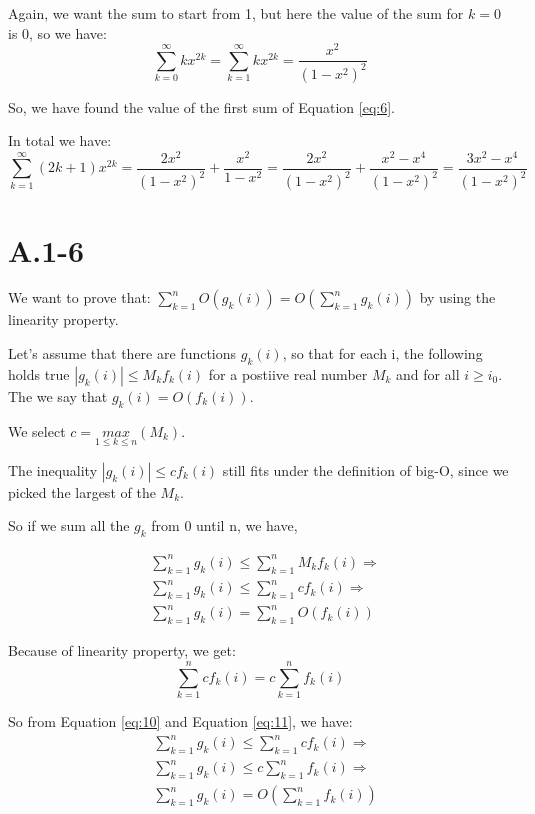 \documentclass{article}
\begin{document}
Again, we want the sum to start from 1, but here the value of the sum for $k = 0$ is 0, so we have:
\begin{equation*}
    \sum_{k=0}^{\infty}{kx^{2k}} = \sum_{k=1}^{\infty}{kx^{2k}} = \frac{x^{2}}{(1-x^{2})^{2}} 
\end{equation*}


So, we have found the value of the first sum of Equation \ref{eq:6}.

In total we have:
\begin{equation*}
    \sum_{k=1}^{\infty}{(2k+1)x^{2k}} = \frac{2x^{2}}{(1-x^{2})^{2}} + \frac{x^{2}}{1-x^{2}} =  \frac{2x^{2}}{(1-x^{2})^{2}}  + \frac{x^{2} - x^{4}}{(1 - x^{2})^{2}} = \frac{3x^{2} - x^{4}}{(1-x^{2})^{2}} 
\end{equation*}

\section*{A.1-6}
We want to prove that: $\sum_{k=1}^{n}{O(g_{k}(i))} = O(\sum_{k=1}^{n}{g_{k}(i)})$ by using the linearity property.

Let's assume that there are functions $g_{k}(i)$, so that for each i, the following holds true $|g_{k}(i)| \leq M_{k}f_{k}(i)$ for a postiive real number $M_{k}$ and for all $i \geq i_{0}$. The we say that $g_{k}(i) = O(f_{k}(i))$. 

We select $c = \underset{1 \leq k \leq n}{max}(M_k)$.

The inequality $|g_{k}(i)| \leq cf_{k}(i)$ still fits under the definition of big-O, since we picked the largest of the $M_{k}$.

So if we sum all the $g_{k}$ from 0 until n, we have,

\begin{align}
    &\sum_{k=1}^{n}{g_{k}(i)} \leq \sum_{k=1}^{n}{M_{k}f_{k}(i)} \Rightarrow\\
    &\sum_{k=1}^{n}{g_{k}(i)} \leq \sum_{k=1}^{n}{cf_{k}(i)} \Rightarrow\\
    &\sum_{k=1}^{n}{g_{k}(i)} = \sum_{k=1}^{n}{O(f_{k}(i))}\label{eq:10}
\end{align}

Because of linearity property, we get:
\begin{equation}\label{eq:11}
    \sum_{k=1}^{n}{cf_{k}(i)} = c\sum_{k=1}^{n}{f_{k}(i)}
\end{equation}

So from Equation \ref{eq:10} and Equation \ref{eq:11}, we have:
\begin{align}
    &\sum_{k=1}^{n}{g_{k}(i)} \leq \sum_{k=1}^{n}{cf_{k}(i)} \Rightarrow \\
    &\sum_{k=1}^{n}{g_{k}(i)} \leq c\sum_{k=1}^{n}{f_{k}(i)} \Rightarrow \\
    &\sum_{k=1}^{n}{g_{k}(i)} = O(\sum_{k=1}^{n}{f_{k}(i)}) \label{eq:12}
\end{align}
\end{document}
